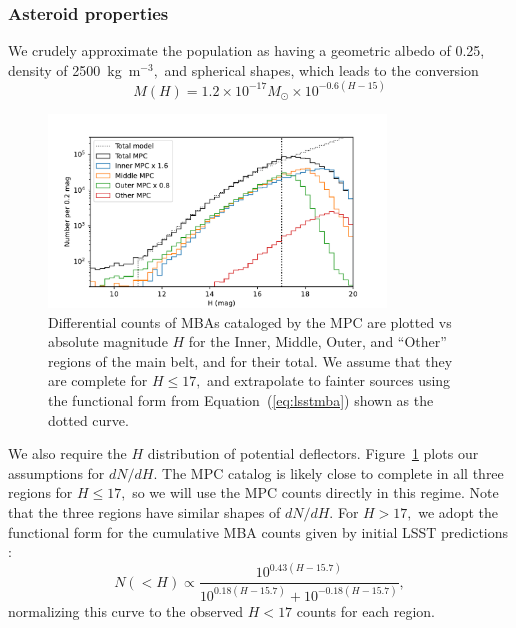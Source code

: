 \documentclass[linenumbers, onecolumn]{aastex631}
\newcommand{\eqq}[1]{Equation~(\ref{#1})}
\begin{document}
\subsubsection{Asteroid properties}
\label{sec:mbaprops}
We crudely approximate the population as having a geometric albedo of 0.25,
density of 2500~kg~m$^{-3},$ and spherical shapes, which leads to the
conversion
\begin{equation}
  M(H) = 1.2\times10^{-17} M_\odot \times 10^{-0.6(H-15)}
\end{equation}

\begin{figure}
  \centering
  \includegraphics[width=0.8\textwidth]{mbacounts.pdf}
  \caption{Differential counts of MBAs cataloged by the MPC are
    plotted vs absolute magnitude $H$  
    for the Inner, Middle, Outer, and ``Other'' regions of
    the main belt, and for their total.  We assume that they are
    complete for $H\le17,$ and extrapolate to fainter sources using
    the functional form from \eqq{eq:lsstmba} shown as the dotted
    curve.}
  \label{fig:counts}
\end{figure}
We also require the $H$ distribution of potential deflectors.
Figure~\ref{fig:counts} plots our assumptions for $dN/dH.$  The MPC
catalog is likely close to complete in all three regions for $H\le17,$
so we will use the MPC counts directly in this regime.  Note that the
three regions have similar shapes of $dN/dH.$  For $H>17,$ we adopt
the functional form for the cumulative MBA counts given by
initial LSST predictions \citep{lsstbook}:
\begin{equation}
  N(<H) \propto \frac{10^{0.43(H-15.7)}}{10^{0.18(H-15.7)} +
    10^{-0.18(H-15.7)}},
\label{eq:lsstmba}
\end{equation}
normalizing this curve to the observed $H<17$ counts for each region.
\end{document}
